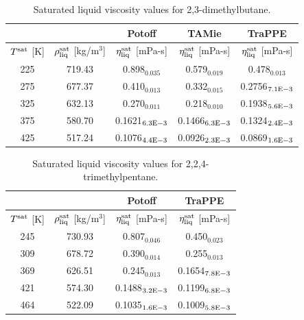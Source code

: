 \documentclass[preprint,review,11pt]{elsarticle}
\begin{document}
	\begin{table}[H]
		\caption{Saturated liquid viscosity values for 2,3-dimethylbutane.}
		\begin{center}
			\begin{tabular}{|c|c|c|c|c|}
				\hline
				&                                       & Potoff            & TAMie             & TraPPE            \\ \hline
				$T^{\rm sat}$ {[}K{]} & $\rho^{\rm sat}_{\rm liq}$ [kg/m$^3$] & $\eta_{\rm liq}^{\rm sat}$ {[}mPa-s{]} & $\eta_{\rm liq}^{\rm sat}$ {[}mPa-s{]} & $\eta_{\rm liq}^{\rm sat}$ {[}mPa-s{]} \\ \hline
				225 & 719.43 & 0.898$_{0.035}$   & 0.579$_{0.019}$   & 0.478$_{0.013}$   \\ \hline
				275 & 677.37 & 0.410$_{0.013}$   & 0.332$_{0.015}$   & 0.2756$_{7.1 \rm E-3}$ \\ \hline
				325 & 632.13 & 0.270$_{0.011}$   & 0.218$_{0.010}$   & 0.1938$_{5.6 \rm E-3}$ \\ \hline
				375 & 580.70 & 0.1621$_{6.3 \rm E-3}$ & 0.1466$_{6.3 \rm E-3}$ & 0.1324$_{2.4 \rm E-3}$ \\ \hline
				425 & 517.24 & 0.1076$_{4.4 \rm E-3}$ & 0.0926$_{2.3 \rm E-3}$ & 0.0869$_{1.6 \rm E-3}$ \\ \hline
			\end{tabular}
		\end{center}
	\end{table}
	
	\begin{table}[H]
		\caption{Saturated liquid viscosity values for 2,2,4-trimethylpentane.}
		\begin{center}
			\begin{tabular}{|c|c|c|c|}
				\hline
				&                                       & Potoff            & TraPPE            \\ \hline
				$T^{\rm sat}$ {[}K{]} & $\rho^{\rm sat}_{\rm liq}$ [kg/m$^3$] & $\eta_{\rm liq}^{\rm sat}$ {[}mPa-s{]} & $\eta_{\rm liq}^{\rm sat}$ {[}mPa-s{]} \\ \hline
				245 & 730.93 & 0.807$_{0.046}$   & 0.450$_{0.023}$   \\ \hline
				309 & 678.72 & 0.390$_{0.014}$   & 0.255$_{0.013}$   \\ \hline
				369 & 626.51 & 0.245$_{0.013}$   & 0.1654$_{7.8 \rm E-3}$ \\ \hline
				421 & 574.30 & 0.1488$_{3.2 \rm E-3}$ & 0.1199$_{6.8 \rm E-3}$ \\ \hline
				464 & 522.09 & 0.1035$_{1.6 \rm E-3}$ & 0.1009$_{5.8 \rm E-3}$ \\ \hline
			\end{tabular}
		\end{center}
	\end{table}
\end{document}
